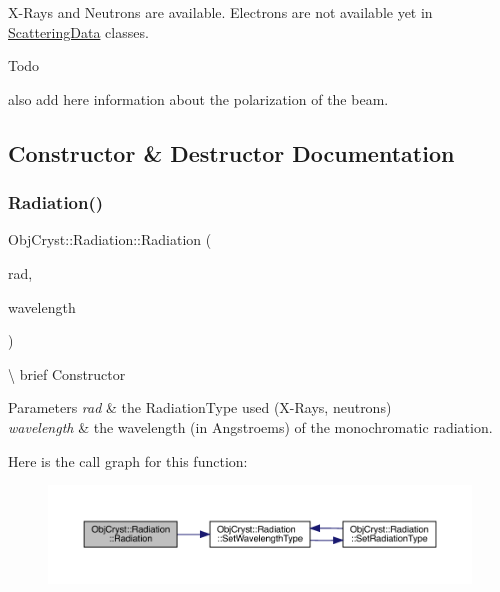 X-\/\+Rays and Neutrons are available. Electrons are not available yet in \mbox{\hyperlink{class_obj_cryst_1_1_scattering_data}{Scattering\+Data}} classes.

\begin{DoxyRefDesc}{Todo}
\item[\mbox{\hyperlink{todo__todo000008}{Todo}}]also add here information about the polarization of the beam. \end{DoxyRefDesc}


\subsection{Constructor \& Destructor Documentation}
\mbox{\label{class_obj_cryst_1_1_radiation_ace67fea27bc640ac4820fc1ba73114d5}} 
\subsubsection{\texorpdfstring{Radiation()}{Radiation()}\hspace{0.1cm}{\footnotesize\ttfamily [1/2]}}
{\footnotesize\ttfamily Obj\+Cryst\+::\+Radiation\+::\+Radiation (\begin{DoxyParamCaption}\item[{const \mbox{\hyperlink{namespace_obj_cryst_a48fe50a094c607f8897378934d3d73ef}{Radiation\+Type}}}]{rad,  }\item[{const R\+E\+AL}]{wavelength }\end{DoxyParamCaption})}

\textbackslash{} brief Constructor


\begin{DoxyParams}{Parameters}
{\em rad} & the Radiation\+Type used (X-\/\+Rays, neutrons) \\
\hline
{\em wavelength} & the wavelength (in Angstroems) of the monochromatic radiation. \\
\hline
\end{DoxyParams}
Here is the call graph for this function\+:
\nopagebreak
\begin{figure}[H]
\begin{center}
\leavevmode
\includegraphics[width=350pt]{class_obj_cryst_1_1_radiation_ace67fea27bc640ac4820fc1ba73114d5_cgraph}
\end{center}
\end{figure}
\mbox{\label{class_obj_cryst_1_1_radiation_a0302f8a0f706db01d0ada609c2e427d4}} 

